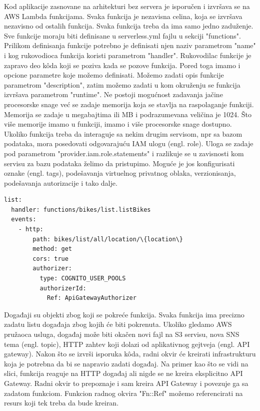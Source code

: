 \documentclass[12pt,oneside]{memoir}
\begin{document}
Kod aplikacije zasnovane na arhitekturi bez servera je isporučen i izvršava se na AWS Lambda funkcijama. Svaka funkcija je nezavisna celina, koja se izvršava nezavisno od ostalih funkcija. Svaka funkcija treba da ima samo jedno zaduženje. Sve funkcije moraju biti definisane u serverless.yml fajlu u sekciji "functions". Prilikom definisanja funkcije potrebno je definisati njen naziv parametrom "name" i kog rukovodioca funkcija koristi parametrom "handler". Rukovodilac funkcije je zapravo deo kôda koji se poziva kada se pozove funkcija. Pored toga imamo i opcione parametre koje možemo definisati. Možemo zadati opis funkcije parametrom "description", zatim možemo zadati u kom okruženju se funkcija izvršava parametrom "runtime". Ne postoji mogućnost zadavanja jačine procesorske snage već se zadaje memorija koja se stavlja na raspolaganje funkciji. Memorija se zadaje u megabajtima ili MB i podrazumevana veličina je 1024. Što više memorije imamo u funkciji, imamo i više procesorske snage dostupno. Ukoliko funkcija treba da interaguje sa nekim drugim servisom, npr sa bazom podataka, mora posedovati odgovarajuću IAM ulogu (engl. role). Uloga se zadaje pod parametrom "provider.iam.role.statements" i razlikuje se u zavisnosti kom servisu za bazu podataka želimo da pristupimo. Moguće je jos konfigurisati oznake (engl. tags), podešavanja virtuelnog privatnog oblaka, verzionisanja, podešavanja autorizacije i tako dalje.
 
\begin{lstlisting}
list:
  handler: functions/bikes/list.listBikes
  events:
    - http:
        path: bikes/list/all/location/\{location\}
        method: get
        cors: true
        authorizer:
          type: COGNITO_USER_POOLS
          authorizerId:
            Ref: ApiGatewayAuthorizer
\end{lstlisting}
 
Događaji su objekti zbog koji se pokreće funkcija. Svaka funkcija ima precizno zadatu listu događaja zbog kojih će biti pokrenuta. Ukoliko gledamo AWS pružaoca usluga, događaj može biti okačen novi fajl na S3 servisu, nova SNS tema (engl. topic), HTTP zahtev koji dolazi od aplikativnog gejtveja (engl. API gateway). Nakon što se izvrši isporuka kôda, radni okvir će kreirati infrastrukturu koja je potrebna da bi se napravio zadati događaj. Na primer kao što se vidi na slici, funkcija reaguje na HTTP događaj ali nigde se ne kreira eksplicitno API Gateway. Radni okvir to prepoznaje i sam kreira API Gateway i povezuje ga sa zadatom funkciom. Funkcion radnog okvira "Fn::Ref" možemo referencirati na resurs koji tek treba da bude kreiran.
 
\end{document}
